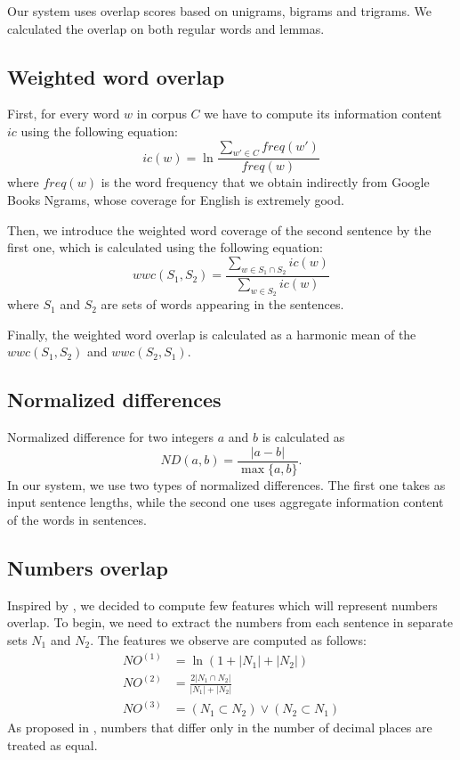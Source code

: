 \documentclass[10pt, a4paper]{article}
\begin{document}
Our system uses overlap scores based on unigrams, bigrams and trigrams. We calculated the overlap on both regular words and lemmas.

\subsection{Weighted word overlap}

First, for every word $w$ in corpus $C$ we have to compute its information content $ic$ using the following equation:
\begin{equation}
	ic(w) = \ln \frac{\sum_{w' \in C} freq(w')}{freq(w)}
\end{equation}
where $freq(w)$ is the word frequency that we obtain indirectly from Google Books Ngrams, whose coverage for English is extremely good. \citep{michel2011quantitative}

Then, we introduce the weighted word coverage of the second sentence by the first one, which is calculated using the following equation:
\begin{equation}
	wwc(S_1, S_2) = \frac{\sum_{w \in S_1 \cap S_2} ic(w)}{\sum_{w \in S_2} ic(w)}
\end{equation}
where $S_1$ and $S_2$ are sets of words appearing in the sentences.

Finally, the weighted word overlap is calculated as a harmonic mean of the $wwc(S_1,S_2)$ and $wwc(S_2,S_1)$.

\subsection{Normalized differences}

Normalized difference for two integers $a$ and $b$ is calculated as
\begin{equation}
	ND(a, b) = \frac{|a - b|}{\max \{a, b\}}.
\end{equation}
In our system, we use two types of normalized differences. The first one takes as input sentence lengths, while the second one uses aggregate information content of the words in sentences.

\subsection{Numbers overlap}

Inspired by
, we decided to compute few features which will represent numbers overlap. To begin, we need to extract the numbers from each sentence in separate sets $N_1$ and $N_2$.
The features we observe are computed as follows:
\begin{align}
	NO^{(1)} &= \ln (1+|N_1|+|N_2|) \\
	NO^{(2)} &= \frac{2 |N_1 \cap N_2|}{|N_1| + |N_2|} \\
	NO^{(3)} &= (N_1 \subset N_2) \vee (N_2 \subset N_1)
\end{align}
As proposed in \citep{vsaric2012takelab}, numbers that differ only in the number of decimal places are treated as equal.
\end{document}

